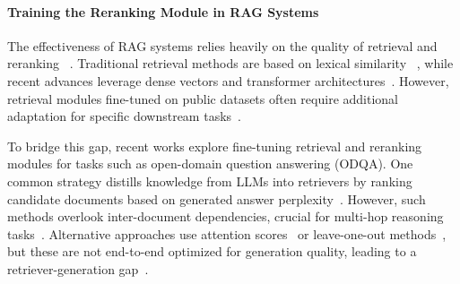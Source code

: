 
\paragraph{Training the Reranking Module in RAG Systems}
The effectiveness of RAG systems relies heavily on the quality of retrieval and reranking ~\cite{DBLP:conf/naacl/GlassRCNCG22, DBLP:journals/corr/abs-2405-18414}. Traditional retrieval methods are based on lexical similarity ~\cite{DBLP:journals/ftir/RobertsonZ09}, while recent advances leverage dense vectors and transformer architectures~\cite{DBLP:conf/emnlp/KarpukhinOMLWEC20, DBLP:conf/sigir/KhattabZ20}. However, retrieval modules fine-tuned on public datasets often require additional adaptation for specific downstream tasks~\cite{DBLP:journals/jmlr/IzacardLLHPSDJRG23, DBLP:conf/sigir/SalemiZ24a}.

To bridge this gap, recent works explore fine-tuning retrieval and reranking modules for tasks such as open-domain question answering (ODQA). One common strategy distills knowledge from LLMs into retrievers by ranking candidate documents based on generated answer perplexity~\cite{DBLP:conf/naacl/ShiMYS0LZY24, DBLP:conf/naacl/GlassRCNCG22, DBLP:conf/iclr/Lin0CSL00KSLZY24}. However, such methods overlook inter-document dependencies, crucial for multi-hop reasoning tasks~\cite{DBLP:journals/tacl/TrivediBKS22, DBLP:conf/coling/HoNSA20}. Alternative approaches use attention scores~\cite{DBLP:conf/iclr/IzacardG21} or leave-one-out methods~\cite{DBLP:journals/jmlr/IzacardLLHPSDJRG23, DBLP:conf/naacl/Asai0H22}, but these are not end-to-end optimized for generation quality, leading to a retriever-generation gap~\cite{DBLP:conf/acl/KeK00MB24}.




